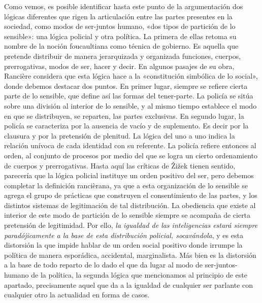 Como vemos, es posible identificar hasta este punto de la argumentación dos lógicas diferentes que rigen la articulación entre las partes presentes en la sociedad, como modos de ser-juntos humano, «dos tipos de partición de lo sensible»: una lógica policial y otra política. La primera de ellas retoma su nombre de la noción foucaultiana como técnica de gobierno. Es aquella que pretende distribuir de manera jerarquizada y organizada funciones, cuerpos, prerrogativas, modos de ser, hacer y decir. En algunos pasajes de su obra, Rancière considera que esta lógica hace a la «constitución simbólica de lo social», donde debemos destacar dos puntos. En primer lugar, siempre se refiere cierta parte de lo sensible, que define así las formas del tener-parte. La policía se sitúa sobre una división al interior de lo sensible, y al mismo tiempo establece el modo en que se distribuyen, se reparten, las partes exclusivas. En segundo lugar, la policía se caracteriza por la ausencia de vacío y de suplemento. Es decir por la clausura y por la pretensión de plenitud. La lógica del uno a uno indica la relación unívoca de cada identidad con su referente. La policía refiere entonces al orden, al conjunto de procesos por medio del que se logra un cierto ordenamiento de cuerpos y prerrogativas. Hasta aquí las críticas de Žižek tienen sentido, parecería que la lógica policial instituye un orden positivo del ser, pero debemos completar la definición rancièrana, ya que a esta organización de lo sensible se agrega el grupo de prácticas que construyen el consentimiento de las partes, y los distintos sistemas de legitimación de tal distribución. La obediencia que existe al interior de este modo de partición de lo sensible siempre se acompaña de cierta pretensión de legitimidad. Por ello, \emph{la igualdad de las inteligencias estará siempre paradójicamente a la base de esta distribución policial, socavándola}, y es esta distorsión la que impide hablar de un orden social positivo donde irrumpe la política de manera esporádica, accidental, marginalista. Más bien es la distorsión a la base de todo reparto de lo dado el que da lugar al modo de ser-juntos-humano de la política, la segunda lógica que mencionamos al principio de este apartado, precisamente aquel que da a la igualdad de cualquier ser parlante con cualquier otro la actualidad en forma de casos.

